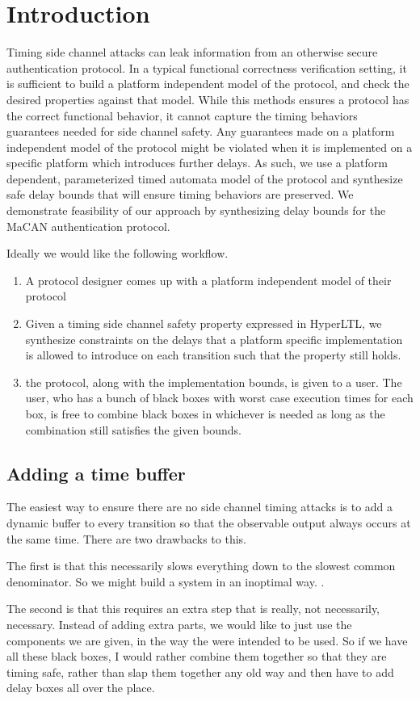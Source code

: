 \section{Introduction}

Timing side channel attacks can leak information from an otherwise secure authentication protocol.
In a typical functional correctness verification setting, it is sufficient to build a platform independent model of the protocol, and check the desired properties against that model.
While this methods ensures a protocol has the correct functional behavior,
  it cannot capture the timing behaviors guarantees needed for side channel safety.
Any guarantees made on a platform independent model of the protocol might be violated when it is implemented on a specific platform which introduces further delays.
As such, we use a platform dependent, parameterized timed automata model of the protocol and synthesize safe delay bounds that will ensure timing behaviors are preserved. 
We demonstrate feasibility of our approach by synthesizing delay bounds for the MaCAN authentication protocol.           

Ideally we would like the following workflow.

\begin{enumerate}
\item A protocol designer comes up with a platform independent model of their protocol
\item Given a timing side channel safety property expressed in HyperLTL, we synthesize constraints on the delays that a platform specific implementation is allowed to introduce on each transition such that the property still holds.
\item the protocol, along with the implementation bounds, is given to a user. The user, who has a bunch of black boxes with worst case execution times for each box, is free to combine black boxes in whichever is needed as long as the combination still satisfies the given bounds.
\end{enumerate}

\subsection{Adding a time buffer}
The easiest way to ensure there are no side channel timing attacks is to add a dynamic buffer to every transition so that the observable output always occurs at the same time. There are two drawbacks to this.

The first is that this necessarily slows everything down to the slowest common denominator. So we might build a system in an inoptimal way. .

The second is that this requires an extra step that is really, not necessarily, necessary. Instead of adding extra parts, we would like to just use the components we are given, in the way the were intended to be used. So if we have all these black boxes, I would rather combine them together so that they are timing safe, rather than slap them together any old way and then have to add delay boxes all over the place.
